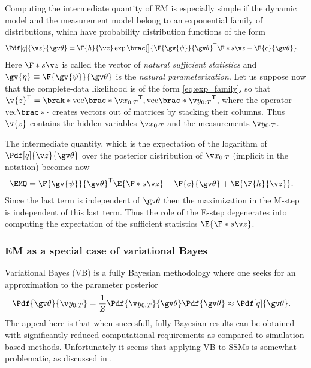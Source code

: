 Computing the intermediate quantity of EM is especially simple
if the dynamic model and the measurement model belong to an exponential
family of distributions, which have probability distribution functions of the form 
\begin{align}
	\Pdf[q]{\z}{\Th}&=\F{h}{\z}\exp\brac[\big]{ \F{\gv{\psi}}{\Th}^\tr \F*{s}{\z}-\F{c}{\Th}}.
	\label{eq:exp_family}
\end{align}
Here $\F*{s}{\z}$ is called the vector of \emph{natural sufficient statistics} and
$\gv{\eta}\equiv \F{\gv{\psi}}{\Th}$ is the \emph{natural parameterization}.
Let us suppose now that the complete-data likelihood is of the form \eqref{eq:exp_family}, so
that $\v{z}^\tr=\brak*{\mathrm{vec}\brac*{\X}^\tr,\mathrm{vec}\brac*{\Y}^\tr}$, where the operator $\mathrm{vec}\brac*{\cdot}$
creates vectors out of matrices by stacking their columns. Thus $\v{z}$ 
contains the hidden variables $\X$ and the measurements $\Y$. 

The intermediate quantity, which is the expectation of the logarithm of $\Pdf[q]{\z}{\Th}$ over the posterior
distribution of $\X$ (implicit in the notation) becomes now
\begin{align}
	\EMQ&=	\F{\gv{\psi}}{\Th}^\tr \E{\F*{s}{\z}}-\F{c}{\Th}+\E{\F{h}{\z}}.
\end{align}
Since the last term is independent of $\Th$ then the maximization in the M-step
is independent of this last term. Thus the role of the E-step degenerates into computing the
expectation of the sufficient statistics $\E{\F*{s}{\z}}$.



\subsubsection*{EM as a special case of variational Bayes}%


Variational Bayes (VB) is a fully Bayesian methodology where one seeks
for an approximation to the parameter posterior \parencite{barber2012bayesian,Bishop2006,Mackay2004,beal2003variational}
\begin{align}
	\Pdf{\Th}{\Y} &= \frac{1}{Z}\Pdf{\Y}{\Th}\Pdf{\Th} \approx \Pdf[q]{\Th}. 
\end{align}
The appeal here is that when succesfull, fully Bayesian results can
be obtained with significantly reduced computational requirements
as compared to simulation based methods. Unfortunately it seems that applying
VB to SSMs is somewhat problematic, as discussed in \textcite{Turner2011}.   

